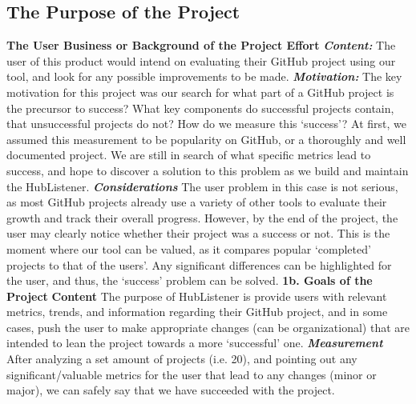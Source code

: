 \documentclass{article}
\begin{document}
\subsection{The Purpose of the Project}
\textbf{The User Business or Background of the Project Effort}
\newline
\textbf{\textit{Content:}} The user of this product would intend on evaluating their GitHub project using our tool, and look for any possible improvements to be made. \newline
\textbf{\textit{Motivation:}}\newline
The key motivation for this project was our search for what part of a GitHub project is the precursor to success? What key components do successful projects contain, that unsuccessful projects do not? How do we measure this ‘success’? At first, we assumed this measurement to be popularity on GitHub, or a thoroughly and well documented project. We are still in search of what specific metrics lead to success, and hope to discover a solution to this problem as we build and maintain the HubListener.  \newline
\textbf{\textit{Considerations}}
The user problem in this case is not serious, as most GitHub projects already use a variety of other tools to evaluate their growth and track their overall progress. However, by the end of the project, the user may clearly notice whether their project was a success or not. This is the moment where our tool can be valued, as it compares popular ‘completed’ projects to that of the users’. Any significant differences can be highlighted for the user, and thus, the ‘success’ problem can be solved. \newline
\textbf{1b. Goals of the Project}
\textbf{Content}\newline
The purpose of HubListener is provide users with relevant metrics, trends, and information regarding their GitHub project, and in some cases, push the user to make appropriate changes (can be organizational) that are intended to lean the project towards a more ‘successful’ one.\newline
\textbf{\textit{Measurement}}
After analyzing a set amount of projects (i.e. 20), and pointing out any significant/valuable metrics for the user that lead to any changes (minor or major), we can safely say that we have succeeded with the project.
\end{document}
